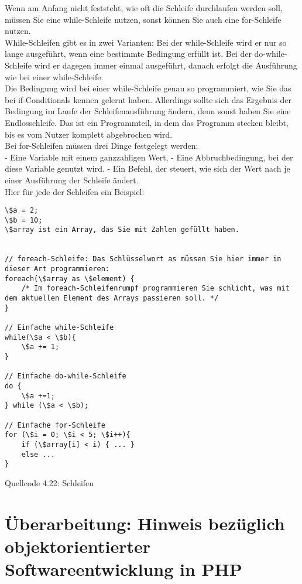 Wenn am Anfang nicht feststeht, wie oft die Schleife durchlaufen werden soll, müssen Sie eine while-Schleife nutzen, sonst können Sie auch eine for-Schleife nutzen.\\

While-Schleifen gibt es in zwei Varianten: Bei der while-Schleife wird er nur so lange ausgeführt, wenn eine bestimmte Bedingung erfüllt ist. Bei der do-while-Schleife wird er dagegen immer einmal ausgeführt, danach erfolgt die Ausführung wie bei einer while-Schleife.\\

Die Bedingung wird bei einer while-Schleife genau so programmiert, wie Sie das bei if-Conditionals kennen gelernt haben. Allerdings sollte sich das Ergebnis der Bedingung im Laufe der Schleifenausführung ändern, denn sonst haben Sie eine Endlosschleife. Das ist ein Programmteil, in dem das Programm stecken bleibt, bis es vom Nutzer komplett abgebrochen wird.\\

Bei for-Schleifen müssen drei Dinge festgelegt werden: \\

-	Eine Variable mit einem ganzzahligen Wert, 
-	Eine Abbruchbedingung, bei der diese Variable genutzt wird.
-	Ein Befehl, der steuert, wie sich der Wert nach je einer Ausführung der Schleife ändert.\\

Hier für jede der Schleifen ein Beispiel:\\

\begin{verbatim}
\$a = 2;
\$b = 10;
\$array ist ein Array, das Sie mit Zahlen gefüllt haben.


// foreach-Schleife: Das Schlüsselwort as müssen Sie hier immer in dieser Art programmieren:
foreach(\$array as \$element) {
	/* Im foreach-Schleifenrumpf programmieren Sie schlicht, was mit dem aktuellen Element des Arrays passieren soll. */
}

// Einfache while-Schleife
while(\$a < \$b){
	\$a += 1;
}

// Einfache do-while-Schleife
do {
	\$a +=1;
} while (\$a < \$b);

// Einfache for-Schleife
for (\$i = 0; \$i < 5; \$i++){
	if (\$array[i] < i) { ... }
	else ...
}
\end{verbatim}
Quellcode 4.22: Schleifen

\section{Überarbeitung: Hinweis bezüglich objektorientierter Softwareentwicklung in PHP}

